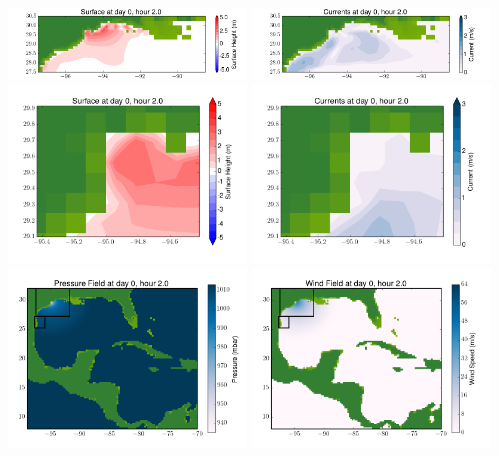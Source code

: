 \documentclass[11pt]{article}
\begin{document}
\includegraphics[width=0.475\textwidth]{frame0074fig4.png}
\vskip 10pt 
\includegraphics[width=0.475\textwidth]{frame0074fig5.png}
\includegraphics[width=0.475\textwidth]{frame0074fig6.png}
\vskip 10pt 
\includegraphics[width=0.475\textwidth]{frame0074fig7.png}
\includegraphics[width=0.475\textwidth]{frame0074fig8.png}
\vskip 10pt 
\includegraphics[width=0.475\textwidth]{frame0074fig9.png}
\end{document}

